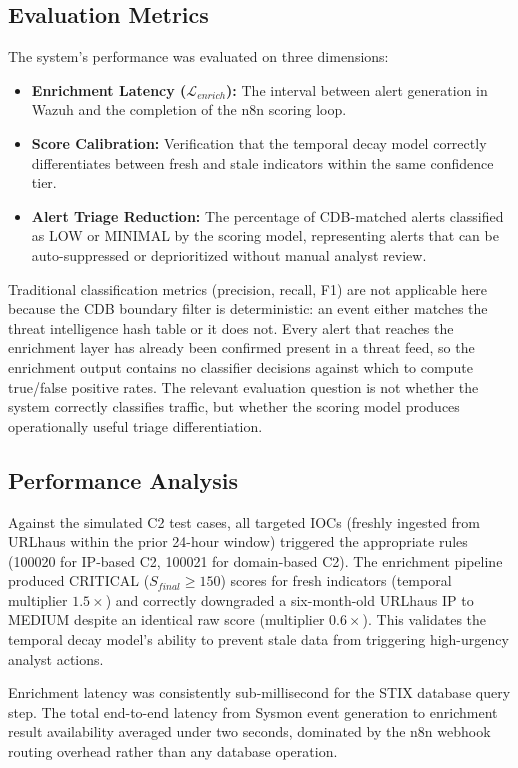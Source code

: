 \documentclass[conference]{IEEEtran}
\begin{document}
\subsection{Evaluation Metrics}
The system's performance was evaluated on three dimensions:
\begin{itemize}
    \item \textbf{Enrichment Latency ($\mathcal{L}_{enrich}$):} The interval between alert generation in Wazuh and the completion of the n8n scoring loop.
    \item \textbf{Score Calibration:} Verification that the temporal decay model correctly differentiates between fresh and stale indicators within the same confidence tier.
    \item \textbf{Alert Triage Reduction:} The percentage of CDB-matched alerts classified as LOW or MINIMAL by the scoring model, representing alerts that can be auto-suppressed or deprioritized without manual analyst review.
\end{itemize}

Traditional classification metrics (precision, recall, F1) are not applicable here because the CDB boundary filter is deterministic: an event either matches the threat intelligence hash table or it does not. Every alert that reaches the enrichment layer has already been confirmed present in a threat feed, so the enrichment output contains no classifier decisions against which to compute true/false positive rates. The relevant evaluation question is not whether the system correctly classifies traffic, but whether the scoring model produces operationally useful triage differentiation.

\subsection{Performance Analysis}

Against the simulated C2 test cases, all targeted IOCs (freshly ingested from URLhaus within the prior 24-hour window) triggered the appropriate rules (100020 for IP-based C2, 100021 for domain-based C2). The enrichment pipeline produced CRITICAL ($S_{final} \geq 150$) scores for fresh indicators (temporal multiplier $1.5\times$) and correctly downgraded a six-month-old URLhaus IP to MEDIUM despite an identical raw score (multiplier $0.6\times$). This validates the temporal decay model's ability to prevent stale data from triggering high-urgency analyst actions.

Enrichment latency was consistently sub-millisecond for the STIX database query step. The total end-to-end latency from Sysmon event generation to enrichment result availability averaged under two seconds, dominated by the n8n webhook routing overhead rather than any database operation.
\end{document}
